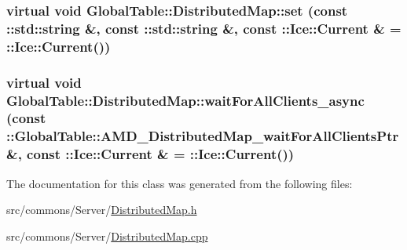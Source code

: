 \label{class_global_table_1_1_distributed_map_af961f29730e0bb80e3c8a9fd2ce0a5a7}
\hypertarget{class_global_table_1_1_distributed_map_a6d83cd25ead69ddbe7c756646ee3a9c1}{
\subsubsection[{set}]{\setlength{\rightskip}{0pt plus 5cm}virtual void GlobalTable::DistributedMap::set (const ::std::string \&, \/  const ::std::string \&, \/  const ::Ice::Current \& = {\ttfamily ::Ice::Current()})}}
\label{class_global_table_1_1_distributed_map_a6d83cd25ead69ddbe7c756646ee3a9c1}
\hypertarget{class_global_table_1_1_distributed_map_a776b9313fa65f6d2c32b8820247045c2}{
\subsubsection[{waitForAllClients\_\-async}]{\setlength{\rightskip}{0pt plus 5cm}virtual void GlobalTable::DistributedMap::waitForAllClients\_\-async (const ::{\bf GlobalTable::AMD\_\-DistributedMap\_\-waitForAllClientsPtr} \&, \/  const ::Ice::Current \& = {\ttfamily ::Ice::Current()})}}
\label{class_global_table_1_1_distributed_map_a776b9313fa65f6d2c32b8820247045c2}


The documentation for this class was generated from the following files:\begin{DoxyCompactItemize}
\item 
src/commons/Server/\hyperlink{_distributed_map_8h}{DistributedMap.h}\item 
src/commons/Server/\hyperlink{_distributed_map_8cpp}{DistributedMap.cpp}\end{DoxyCompactItemize}
